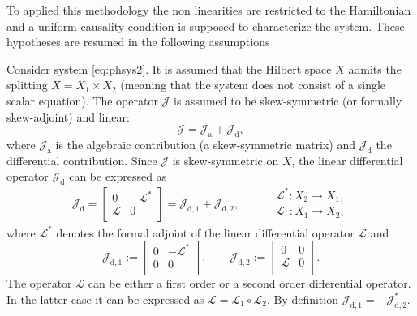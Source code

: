 To applied this methodology the non linearities are restricted to the Hamiltonian and a uniform causality condition is supposed to characterize the system. These hypotheses are resumed in the following assumptions
\begin{assumption}\label{ass:linJ}
	Consider system \eqref{eq:phsys2}. It is assumed that the Hilbert space $X$ admits the splitting $X = X_1 \times X_2$ (meaning that the system does not consist of a single scalar equation). The operator $\mathcal{J}$ is assumed to be skew-symmetric (or formally skew-adjoint) and linear:
	\begin{equation}\label{eq:assJ}
	\mathcal{J} = \mathcal{J}_{\text{a}} + \mathcal{J}_{\text{d}},
	\end{equation}
	where $\mathcal{J}_{\text{a}}$ is the algebraic contribution (a skew-symmetric matrix) and $\mathcal{J}_{\text{d}}$ the differential contribution. Since $\mathcal{J}$ is skew-symmetric on $X$, the linear differential operator $\mathcal{J}_{\text{d}}$ can be expressed as
	\begin{equation}\label{eq:assJd}
	\mathcal{J}_{\text{d}} = 
	\begin{bmatrix}
	0 & -\mathcal{L}^* \\
	\mathcal{L} & 0 \\
	\end{bmatrix} = \mathcal{J}_{\text{d}, 1} + \mathcal{J}_{\text{d}, 2}, \qquad 
	\begin{aligned}
	&\mathcal{L}^* : X_2 \rightarrow X_1, \\
	&\mathcal{L}\;\, : X_1 \rightarrow X_2, \\
	\end{aligned}
	\end{equation}
	where $\mathcal{L}^*$ denotes the formal adjoint of the linear differential operator $\mathcal{L}$ and 
	\begin{equation*}
		\mathcal{J}_{\text{d}, 1}:= \begin{bmatrix}
		0 & -\mathcal{L}^* \\
		0 & 0 \\
		\end{bmatrix}, \qquad 
		\mathcal{J}_{\text{d}, 2} := \begin{bmatrix}
		0 & 0 \\
		\mathcal{L} & 0 \\
		\end{bmatrix}.
	\end{equation*}
	The operator $\mathcal{L}$ can be either a first order or a second order differential operator. In the latter case it can be expressed as $\mathcal{L} = \mathcal{L}_1 \circ \mathcal{L}_2$. By definition $\mathcal{J}_{\text{d}, 1} = - \mathcal{J}_{\text{d}, 2}^*$.
\end{assumption}
